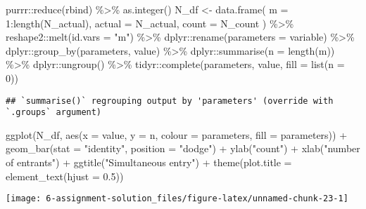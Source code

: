 \documentclass[
]{article}
\newenvironment{Shaded}{\begin{snugshade}}{\end{snugshade}}
\newcommand{\AttributeTok}[1]{\textcolor[rgb]{0.77,0.63,0.00}{#1}}
\newcommand{\DecValTok}[1]{\textcolor[rgb]{0.00,0.00,0.81}{#1}}
\newcommand{\FloatTok}[1]{\textcolor[rgb]{0.00,0.00,0.81}{#1}}
\newcommand{\FunctionTok}[1]{\textcolor[rgb]{0.00,0.00,0.00}{#1}}
\newcommand{\NormalTok}[1]{#1}
\newcommand{\OtherTok}[1]{\textcolor[rgb]{0.56,0.35,0.01}{#1}}
\newcommand{\SpecialCharTok}[1]{\textcolor[rgb]{0.00,0.00,0.00}{#1}}
\newcommand{\StringTok}[1]{\textcolor[rgb]{0.31,0.60,0.02}{#1}}
\begin{document}
\begin{Shaded}
\begin{Highlighting}[]
\NormalTok{  purrr}\SpecialCharTok{::}\FunctionTok{reduce}\NormalTok{(rbind) }\SpecialCharTok{\%\textgreater{}\%}
  \FunctionTok{as.integer}\NormalTok{()}
\NormalTok{N\_df }\OtherTok{\textless{}{-}} \FunctionTok{data.frame}\NormalTok{(}
  \AttributeTok{m =} \DecValTok{1}\SpecialCharTok{:}\FunctionTok{length}\NormalTok{(N\_actual),}
  \AttributeTok{actual =}\NormalTok{ N\_actual,}
  \AttributeTok{count =}\NormalTok{ N\_count}
\NormalTok{) }\SpecialCharTok{\%\textgreater{}\%}
\NormalTok{  reshape2}\SpecialCharTok{::}\FunctionTok{melt}\NormalTok{(}\AttributeTok{id.vars =} \StringTok{"m"}\NormalTok{) }\SpecialCharTok{\%\textgreater{}\%}
\NormalTok{  dplyr}\SpecialCharTok{::}\FunctionTok{rename}\NormalTok{(}\AttributeTok{parameters =}\NormalTok{ variable) }\SpecialCharTok{\%\textgreater{}\%}
\NormalTok{  dplyr}\SpecialCharTok{::}\FunctionTok{group\_by}\NormalTok{(parameters, value) }\SpecialCharTok{\%\textgreater{}\%}
\NormalTok{  dplyr}\SpecialCharTok{::}\FunctionTok{summarise}\NormalTok{(}\AttributeTok{n =} \FunctionTok{length}\NormalTok{(m)) }\SpecialCharTok{\%\textgreater{}\%}
\NormalTok{  dplyr}\SpecialCharTok{::}\FunctionTok{ungroup}\NormalTok{() }\SpecialCharTok{\%\textgreater{}\%}
\NormalTok{  tidyr}\SpecialCharTok{::}\FunctionTok{complete}\NormalTok{(parameters, value, }\AttributeTok{fill =} \FunctionTok{list}\NormalTok{(}\AttributeTok{n =} \DecValTok{0}\NormalTok{))}
\end{Highlighting}
\end{Shaded}

\begin{verbatim}
## `summarise()` regrouping output by 'parameters' (override with `.groups` argument)
\end{verbatim}

\begin{Shaded}
\begin{Highlighting}[]
\FunctionTok{ggplot}\NormalTok{(N\_df, }\FunctionTok{aes}\NormalTok{(}\AttributeTok{x =}\NormalTok{ value, }\AttributeTok{y =}\NormalTok{ n, }\AttributeTok{colour =}\NormalTok{ parameters, }\AttributeTok{fill =}\NormalTok{ parameters)) }\SpecialCharTok{+}
  \FunctionTok{geom\_bar}\NormalTok{(}\AttributeTok{stat =} \StringTok{"identity"}\NormalTok{, }\AttributeTok{position =} \StringTok{"dodge"}\NormalTok{) }\SpecialCharTok{+}
  \FunctionTok{ylab}\NormalTok{(}\StringTok{"count"}\NormalTok{) }\SpecialCharTok{+} \FunctionTok{xlab}\NormalTok{(}\StringTok{"number of entrants"}\NormalTok{) }\SpecialCharTok{+} \FunctionTok{ggtitle}\NormalTok{(}\StringTok{"Simultaneous entry"}\NormalTok{) }\SpecialCharTok{+}
  \FunctionTok{theme}\NormalTok{(}\AttributeTok{plot.title =} \FunctionTok{element\_text}\NormalTok{(}\AttributeTok{hjust =} \FloatTok{0.5}\NormalTok{))}
\end{Highlighting}
\end{Shaded}

\begin{center}\texttt{[image: 6-assignment-solution\_files/figure-latex/unnamed-chunk-23-1]} \end{center}
\end{document}
